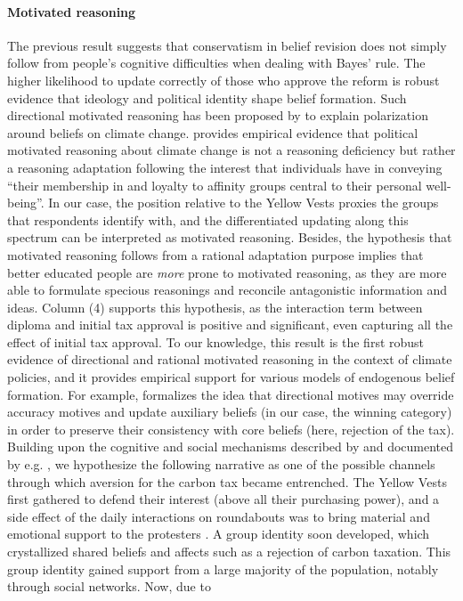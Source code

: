 \documentclass[12pt]{article} %
\begin{document}
\paragraph{Motivated reasoning} %


The previous result suggests that conservatism in belief revision does not simply follow from people's cognitive difficulties when dealing with Bayes' rule. The higher likelihood to update correctly of those who approve the reform is robust evidence that ideology and political identity shape belief formation. Such directional motivated reasoning has been proposed by \citet{druckman_evidence_2019} to explain polarization around beliefs on climate change. \citet{kahan_ideology_2013} provides empirical evidence that political motivated reasoning about climate change is not a reasoning deficiency but rather a reasoning adaptation following the interest that individuals have in conveying ``their membership in and loyalty to affinity groups central to their personal well-being''. In our case, the position relative to the Yellow Vests proxies the groups that respondents identify with, and the differentiated updating along this spectrum can be interpreted as motivated reasoning. Besides, the hypothesis that motivated reasoning follows from a rational adaptation purpose implies that better educated people are \textit{more} prone to motivated reasoning, as they are more able to formulate specious reasonings and reconcile antagonistic information and ideas. Column (4) supports this hypothesis, as the interaction term between diploma and initial tax approval is positive and significant, even capturing all the effect of initial tax approval. To our knowledge, this result is the first robust evidence of directional and rational motivated reasoning in the context of climate policies, and it provides empirical support for various models of endogenous belief formation. For example, \citet{little_distortion_2019} formalizes the idea that directional motives may override accuracy motives and update auxiliary beliefs (in our case, the winning category) in order to preserve their consistency with core beliefs (here, rejection of the tax). Building upon the cognitive and social mechanisms described by \citet{kraft_why_2015} and documented by e.g. \citet{redlawsk_hot_2002}, we hypothesize the following narrative as one of the possible channels through which aversion for the carbon tax became entrenched. The Yellow Vests first gathered to defend their interest (above all their purchasing power), and a side effect of the daily interactions on roundabouts was to bring material and emotional support to the protesters \citep{challier_rencontres_2019}. A group identity soon developed, which crystallized shared beliefs and affects such as a rejection of carbon taxation. This group identity gained support from a large majority of the population, notably through social networks. Now, due to 
\end{document}
